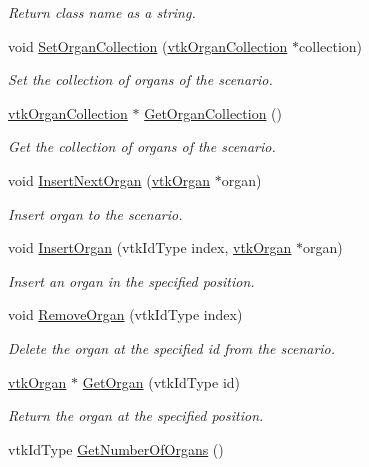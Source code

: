 \begin{DoxyCompactItemize}
\begin{DoxyCompactList}\small\item\em Return class name as a string. \item\end{DoxyCompactList}\item 
void \hyperlink{classvtkScenario_afff48d5fa445019c74d0ae9b6cc42376}{SetOrganCollection} (\hyperlink{classvtkOrganCollection}{vtkOrganCollection} $\ast$collection)
\begin{DoxyCompactList}\small\item\em Set the collection of organs of the scenario. \item\end{DoxyCompactList}\item 
\hyperlink{classvtkOrganCollection}{vtkOrganCollection} $\ast$ \hyperlink{classvtkScenario_a9e518be8bb47a65ae2b8a8ef02f579df}{GetOrganCollection} ()
\begin{DoxyCompactList}\small\item\em Get the collection of organs of the scenario. \item\end{DoxyCompactList}\item 
void \hyperlink{classvtkScenario_ab7aa43b4f165675fdfc437e142a466f3}{InsertNextOrgan} (\hyperlink{classvtkOrgan}{vtkOrgan} $\ast$organ)
\begin{DoxyCompactList}\small\item\em Insert organ to the scenario. \item\end{DoxyCompactList}\item 
void \hyperlink{classvtkScenario_a449c388c17ebaa975c69269e2b032530}{InsertOrgan} (vtkIdType index, \hyperlink{classvtkOrgan}{vtkOrgan} $\ast$organ)
\begin{DoxyCompactList}\small\item\em Insert an organ in the specified position. \item\end{DoxyCompactList}\item 
void \hyperlink{classvtkScenario_a8b78726133ade77ee874c0e9c4f8028a}{RemoveOrgan} (vtkIdType index)
\begin{DoxyCompactList}\small\item\em Delete the organ at the specified id from the scenario. \item\end{DoxyCompactList}\item 
\hyperlink{classvtkOrgan}{vtkOrgan} $\ast$ \hyperlink{classvtkScenario_ab4eab345474f9ad99730b0b3468c514c}{GetOrgan} (vtkIdType id)
\begin{DoxyCompactList}\small\item\em Return the organ at the specified position. \item\end{DoxyCompactList}\item 
\hypertarget{classvtkScenario_a307ee511703c2ddf869b8689317e9f45}{
vtkIdType \hyperlink{classvtkScenario_a307ee511703c2ddf869b8689317e9f45}{GetNumberOfOrgans} ()}
\label{classvtkScenario_a307ee511703c2ddf869b8689317e9f45}


\end{DoxyCompactItemize}
